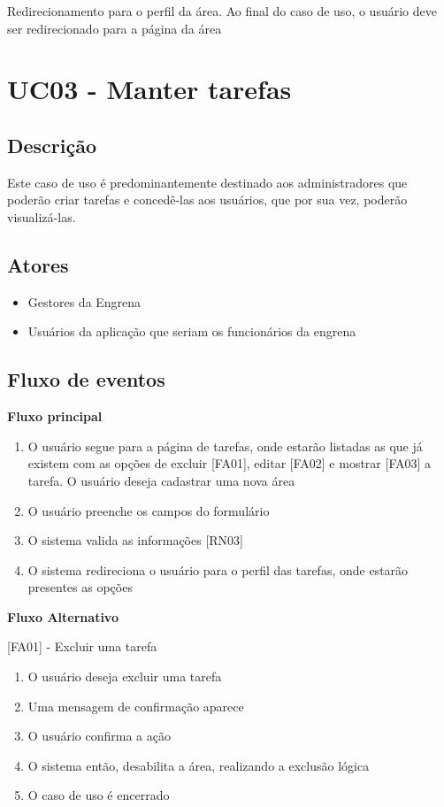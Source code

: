 \begin{apendicesenv}
Redirecionamento para o perfil da área. Ao final do caso de uso, o usuário deve ser redirecionado para a página da área


\section{UC03 - Manter tarefas}

\subsection{Descrição}

Este caso de uso é predominantemente destinado aos administradores que poderão criar tarefas e concedê-las aos usuários, que por sua vez, poderão visualizá-las.


\subsection{Atores}

\begin{itemize}
  \item{Gestores da Engrena}
  \item{Usuários da aplicação que seriam os funcionários da engrena}
\end{itemize}

\subsection{Fluxo de eventos}

\textbf{Fluxo principal}

\begin{enumerate}
  \item{O usuário segue para a página de tarefas, onde estarão listadas as que já existem com as opções de excluir [FA01], editar [FA02] e mostrar [FA03] a tarefa. O usuário deseja cadastrar uma nova área}
  \item{O usuário preenche os campos do formulário}
  \item{O sistema valida as informações [RN03]}
  \item{O sistema redireciona o usuário para o perfil das tarefas, onde estarão presentes as opções}
\end{enumerate}


\textbf{Fluxo Alternativo}

[FA01] - Excluir uma tarefa
\begin{enumerate}
  \item{O usuário deseja excluir uma tarefa}
  \item{Uma mensagem de confirmação aparece}
  \item{O usuário confirma a ação}
  \item{O sistema então, desabilita a área, realizando a exclusão lógica}
  \item{O caso de uso é encerrado}
\end{enumerate}



\end{apendicesenv}

